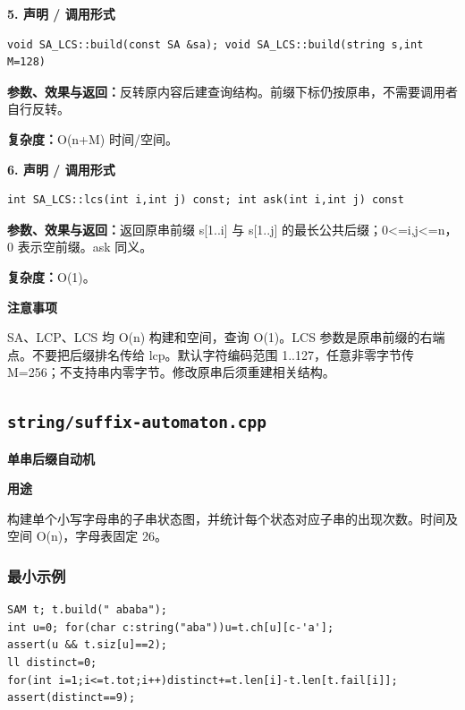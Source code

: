\documentclass[UTF8,a4paper,10pt]{ctexart}
\newcommand{\TemplUsage}[1]{\textbf{用途}\par #1\par}
\newcommand{\TemplNote}[1]{\textbf{注意事项}\par #1\par}
\begin{document}
\noindent\begin{minipage}{\textwidth}
\textbf{5. 声明 / 调用形式}
\begin{lstlisting}
void SA_LCS::build(const SA &sa); void SA_LCS::build(string s,int M=128)
\end{lstlisting}
\textbf{参数、效果与返回：}反转原内容后建查询结构。前缀下标仍按原串，不需要调用者自行反转。

\textbf{复杂度：}O(n+M) 时间/空间。

\end{minipage}\par\vspace{0.4em}
\noindent\begin{minipage}{\textwidth}
\textbf{6. 声明 / 调用形式}
\begin{lstlisting}
int SA_LCS::lcs(int i,int j) const; int ask(int i,int j) const
\end{lstlisting}
\textbf{参数、效果与返回：}返回原串前缀 s[1..i] 与 s[1..j] 的最长公共后缀；0<=i,j<=n，0 表示空前缀。ask 同义。

\textbf{复杂度：}O(1)。

\TemplNote{SA、LCP、LCS 均 O(n) 构建和空间，查询 O(1)。LCS 参数是原串前缀的右端点。不要把后缀排名传给 lcp。默认字符编码范围 1..127，任意非零字节传 M=256；不支持串内零字节。修改原串后须重建相关结构。}
\end{minipage}\par\vspace{0.4em}
\clearpage
\subsection{\texttt{string/suffix-automaton.cpp}}
\textbf{单串后缀自动机}\par
\TemplUsage{构建单个小写字母串的子串状态图，并统计每个状态对应子串的出现次数。时间及空间 O(n)，字母表固定 26。}
\subsubsection*{最小示例}
\begin{lstlisting}
SAM t; t.build(" ababa");
int u=0; for(char c:string("aba"))u=t.ch[u][c-'a'];
assert(u && t.siz[u]==2);
ll distinct=0;
for(int i=1;i<=t.tot;i++)distinct+=t.len[i]-t.len[t.fail[i]];
assert(distinct==9);
\end{lstlisting}
\end{document}
